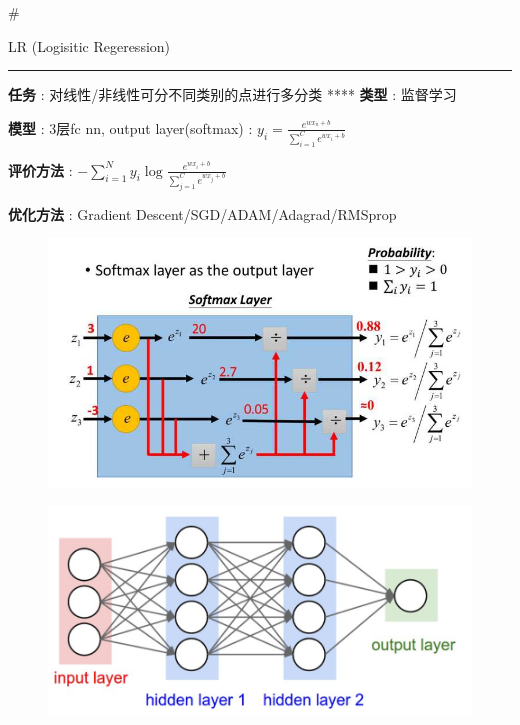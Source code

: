 \documentclass[11pt]{article}
\makeatletter
\def\maxwidth{\ifdim\Gin@nat@width>\linewidth\linewidth
    \else\Gin@nat@width\fi}
\let\Oldincludegraphics\includegraphics
\renewcommand{\includegraphics}[1]{\Oldincludegraphics[width=.8\maxwidth]{#1}}
\makeatother
\begin{document}
    \#

LR (Logisitic Regeression)

\begin{center}\rule{0.5\linewidth}{\linethickness}\end{center}

\textbf{任务} : 对线性/非线性可分不同类别的点进行多分类 ****
\textbf{类型} : 监督学习

\textbf{模型} : 3层fc nn, output layer(softmax) :
\({y_i} = \frac{{{e^{w{x_n} + b}}}}{{\sum\limits_{i = 1}^C {{e^{w{x_i} + b}}} }}\)

\textbf{评价方法} :
\(- \sum\limits_{i = 1}^N {{y_i}\log \frac{{{e^{w{x_i} + b}}}}{{\sum\limits_{j = 1}^C {{e^{w{x_j} + b}}} }}}\)

\textbf{优化方法} : Gradient Descent/SGD/ADAM/Adagrad/RMSprop

\begin{figure}
\centering
\includegraphics{softmax.png}
\caption{}
\end{figure}

    \begin{figure}
\centering
\includegraphics{bp.png}
\caption{}
\end{figure}
\end{document}
